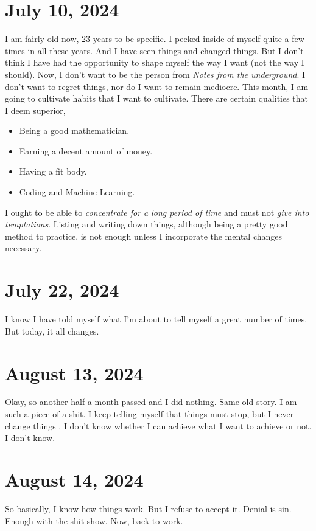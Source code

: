 \section{July 10, 2024}
\noindent I am fairly old now, 23 years to be specific. I peeked inside of myself quite a few times in all
these years. And I have seen things and changed things. But I don't think I have had the opportunity to
shape myself the way I want (not the way I should). Now, I don't want to be the person from \emph{Notes
from the underground}. I don't want to regret things, nor do I want to remain mediocre. This month, I am
going to cultivate habits that I want to cultivate. There are certain qualities that I deem superior,

\begin{itemize}
\itemsep0em
	\item Being a good mathematician.
	\item Earning a decent amount of money.
	\item Having a fit body.
	\item Coding and Machine Learning.
\end{itemize}

\noindent I ought to be able to \emph{concentrate for a long period of time} and must not \emph{give into
temptations}. Listing and writing down things, although being a pretty good method to practice, is not 
enough unless I incorporate the mental changes necessary.

\section{July 22, 2024}
\noindent I know I have told myself what I'm about to tell myself a great number of times. But today, it all
changes.

\section{August 13, 2024}
\noindent Okay, so another half a month passed and I did nothing. Same old story. I am such a piece of a shit.
I keep telling myself that things must stop, but I never change things . I don't know whether I can
achieve what I want to achieve or not. I don't know.

\section{August 14, 2024}
\noindent So basically, I know how things work. But I refuse to accept it. Denial is sin. Enough with the shit
show. Now, back to work.

